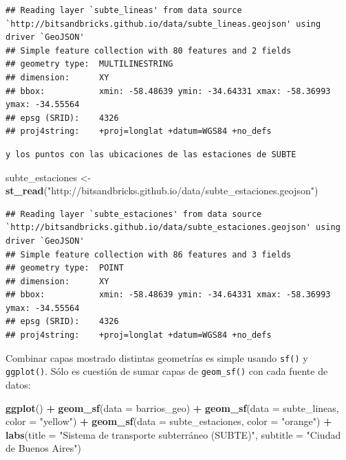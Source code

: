 \documentclass[]{book}
\newenvironment{Shaded}{\begin{snugshade}}{\end{snugshade}}
\newcommand{\KeywordTok}[1]{\textcolor[rgb]{0.13,0.29,0.53}{\textbf{#1}}}
\newcommand{\DataTypeTok}[1]{\textcolor[rgb]{0.13,0.29,0.53}{#1}}
\newcommand{\StringTok}[1]{\textcolor[rgb]{0.31,0.60,0.02}{#1}}
\newcommand{\OperatorTok}[1]{\textcolor[rgb]{0.81,0.36,0.00}{\textbf{#1}}}
\newcommand{\NormalTok}[1]{#1}
\begin{document}
\begin{verbatim}
## Reading layer `subte_lineas' from data source `http://bitsandbricks.github.io/data/subte_lineas.geojson' using driver `GeoJSON'
## Simple feature collection with 80 features and 2 fields
## geometry type:  MULTILINESTRING
## dimension:      XY
## bbox:           xmin: -58.48639 ymin: -34.64331 xmax: -58.36993 ymax: -34.55564
## epsg (SRID):    4326
## proj4string:    +proj=longlat +datum=WGS84 +no_defs
\end{verbatim}

\begin{verbatim}
y los puntos con las ubicaciones de las estaciones de SUBTE
\end{verbatim}

\begin{Shaded}
\begin{Highlighting}[]
\NormalTok{subte_estaciones <-}\StringTok{ }\KeywordTok{st_read}\NormalTok{(}\StringTok{"http://bitsandbricks.github.io/data/subte_estaciones.geojson"}\NormalTok{)}
\end{Highlighting}
\end{Shaded}

\begin{verbatim}
## Reading layer `subte_estaciones' from data source `http://bitsandbricks.github.io/data/subte_estaciones.geojson' using driver `GeoJSON'
## Simple feature collection with 86 features and 3 fields
## geometry type:  POINT
## dimension:      XY
## bbox:           xmin: -58.48639 ymin: -34.64331 xmax: -58.36993 ymax: -34.55564
## epsg (SRID):    4326
## proj4string:    +proj=longlat +datum=WGS84 +no_defs
\end{verbatim}

Combinar capas mostrado distintas geometrías es simple usando
\texttt{sf()} y \texttt{ggplot()}. Sólo es cuestión de sumar capas de
\texttt{geom\_sf()} con cada fuente de datos:

\begin{Shaded}
\begin{Highlighting}[]
\KeywordTok{ggplot}\NormalTok{() }\OperatorTok{+}
\StringTok{    }\KeywordTok{geom_sf}\NormalTok{(}\DataTypeTok{data =}\NormalTok{ barrios_geo) }\OperatorTok{+}
\StringTok{    }\KeywordTok{geom_sf}\NormalTok{(}\DataTypeTok{data =}\NormalTok{ subte_lineas, }\DataTypeTok{color =} \StringTok{"yellow"}\NormalTok{) }\OperatorTok{+}
\StringTok{    }\KeywordTok{geom_sf}\NormalTok{(}\DataTypeTok{data =}\NormalTok{ subte_estaciones, }\DataTypeTok{color =} \StringTok{"orange"}\NormalTok{) }\OperatorTok{+}
\StringTok{    }\KeywordTok{labs}\NormalTok{(}\DataTypeTok{title =} \StringTok{"Sistema de transporte subterráneo (SUBTE)"}\NormalTok{,}
         \DataTypeTok{subtitle =} \StringTok{"Ciudad de Buenos Aires"}\NormalTok{)}
\end{Highlighting}
\end{Shaded}
\end{document}
